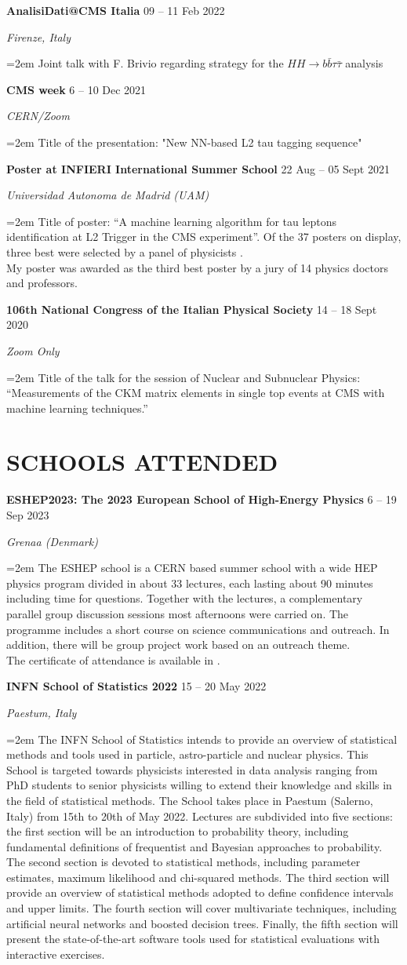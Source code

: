 \documentclass[paper=a4,fontsize=12pt]{article} %
\newcommand{\openquote}{``}
\newcommand{\closequote}{''}
\newcommand{\hhbbtt}{$ HH \rightarrow b\bar{b}\tau\bar{\tau}$ }
\newcommand{\sepspace}{\vspace*{1em}}		%
\newcommand{\NewPart}[1]{\section*{\uppercase{#1}}}
\newcommand{\EducationEntry}[4]{
	\noindent \textbf{#1} \hfill      %
	{#2} \par  %
	\noindent \textit{#3} \par        %
	\noindent\hangindent=2em\hangafter=0 \small #4 %
	\normalsize \par}
\begin{document}
	\sepspace
	\EducationEntry{AnalisiDati@CMS Italia}{09 -- 11 Feb 2022}{Firenze, Italy}{Joint talk with F. Brivio regarding strategy for the \hhbbtt analysis \cite{analisidatifirenze}}
	\sepspace 
	\EducationEntry{CMS week}{ 6 -- 10 Dec 2021}{CERN/Zoom}{\vspace{-2mm}Title of the presentation: "New NN-based L2 tau tagging sequence" \cite{cmsweek21}}
	\sepspace
	\EducationEntry{Poster at INFIERI International Summer School}{ 22 Aug -- 05 Sept 2021}{Universidad Autonoma de Madrid (UAM)}{Title of poster: \openquote A machine learning algorithm for tau leptons identification at L2 Trigger in the CMS experiment\closequote. Of the 37 posters on display, three best were selected by a panel of physicists \cite{infieri_poster}.\\ My poster was awarded as the third best poster by a jury of 14 physics doctors and professors.}
	\sepspace
	\EducationEntry{106th National Congress of the Italian Physical Society}{14 -- 18 Sept 2020}{Zoom Only}{Title of the talk for the session of Nuclear and Subnuclear Physics: \openquote Measurements of the CKM matrix elements in single top events at CMS with machine learning techniques.\closequote \;\cite{CongresSIF}}
	\sepspace	
	\NewPart{Schools attended}
	\EducationEntry{ESHEP2023: The 2023 European School of High-Energy Physics}{6 -- 19 Sep 2023}{Grenaa (Denmark)}{The ESHEP school is a CERN based summer school with a wide HEP physics program divided in about 33 lectures, each lasting about 90 minutes including time for questions. Together with the lectures, a complementary parallel group discussion sessions most afternoons were carried on. The programme includes a short course on science communications and outreach. In addition, there will be group project work based on an outreach theme. \cite{eshep}\\The certificate of attendance is available in \cite{eshep_cert}.}
	\sepspace
	\EducationEntry{INFN School of Statistics 2022}{15 -- 20 May 2022}{Paestum, Italy}{
The INFN School of Statistics intends to provide an overview of statistical methods and tools used in particle, astro-particle and nuclear physics. This School is targeted towards physicists interested in data analysis ranging from PhD students to senior physicists willing to extend their knowledge and skills in the field of statistical methods. The School takes place in Paestum (Salerno, Italy) from 15th to 20th of May 2022. Lectures are subdivided into five sections: the first section will be an introduction to probability theory, including fundamental definitions of frequentist and Bayesian approaches to probability. The second section is devoted to statistical methods, including parameter estimates, maximum likelihood and chi-squared methods. The third section will provide an overview of statistical methods adopted to define confidence intervals and upper limits. The fourth section will cover multivariate techniques, including artificial neural networks and boosted decision trees. Finally, the fifth section will present the state-of-the-art software tools used for statistical evaluations with interactive exercises. \cite{statschool}}
\end{document}
